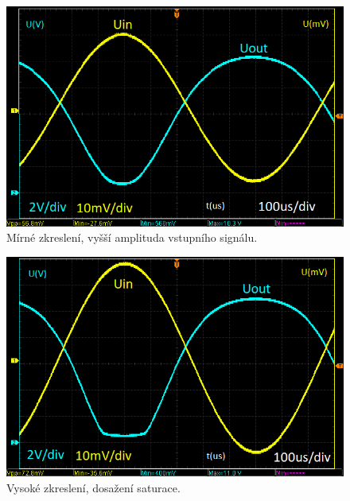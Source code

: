 \documentclass{protokol}
\begin{document}
	\begin{figure}[h!]
		\centering
		\includegraphics[width=\textwidth]{oscilo/2done.png}
		\centering
		\caption{Mírné zkreslení, vyšší amplituda vstupního signálu.}
		\label{fig:-osc_}
	\end{figure}
	
	\begin{figure}[h!]
		\centering
		\includegraphics[width=\textwidth]{oscilo/3done.png}
		\centering
		\caption{Vysoké zkreslení, dosažení saturace.}
		\label{fig:-osc_}
	\end{figure}
	
\end{document}
